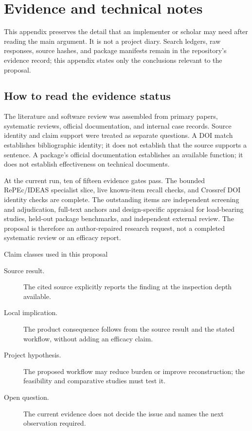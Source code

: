 \chapter{Evidence and technical notes}
\label{app:notes}

This appendix preserves the detail that an implementer or scholar may need
after reading the main argument. It is not a project diary. Search ledgers,
raw responses, source hashes, and package manifests remain in the repository's
evidence record; this appendix states only the conclusions relevant to the
proposal.

\section{How to read the evidence status}

The literature and software review was assembled from primary papers,
systematic reviews, official documentation, and internal case records. Source
identity and claim support were treated as separate questions. A DOI match
establishes bibliographic identity; it does not establish that the source
supports a sentence. A package's official documentation establishes an
available function; it does not establish effectiveness on technical
documents.

At the current run, ten of fifteen evidence gates pass. The bounded
RePEc/IDEAS specialist slice, live known-item recall checks, and Crossref DOI
identity checks are complete. The outstanding items are independent screening
and adjudication, full-text anchors and design-specific appraisal for
load-bearing studies, held-out package benchmarks, and independent external
review. The proposal is therefore an author-repaired research request, not a
completed systematic review or an efficacy report.

\begin{boundarybox}{Claim classes used in this proposal}
\begin{description}
\item[Source result.] The cited source explicitly reports the finding at the
  inspection depth available.
\item[Local implication.] The product consequence follows from the source
  result and the stated workflow, without adding an efficacy claim.
\item[Project hypothesis.] The proposed workflow may reduce burden or improve
  reconstruction; the feasibility and comparative studies must test it.
\item[Open question.] The current evidence does not decide the issue and names
  the next observation required.
\end{description}
\end{boundarybox}

